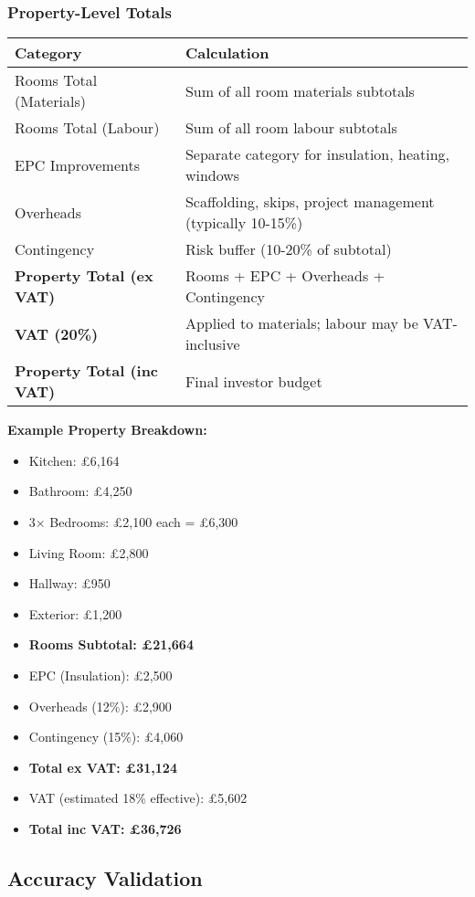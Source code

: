 \documentclass[11pt,a4paper]{article}
\begin{document}
\subsubsection{Property-Level Totals}

\begin{longtable}{@{}p{6cm}p{8cm}@{}}
\toprule
\textbf{Category} & \textbf{Calculation} \\
\midrule
Rooms Total (Materials) & Sum of all room materials subtotals \\
Rooms Total (Labour) & Sum of all room labour subtotals \\
EPC Improvements & Separate category for insulation, heating, windows \\
Overheads & Scaffolding, skips, project management (typically 10-15\%) \\
Contingency & Risk buffer (10-20\% of subtotal) \\
\addlinespace
\textbf{Property Total (ex VAT)} & Rooms + EPC + Overheads + Contingency \\
\textbf{VAT (20\%)} & Applied to materials; labour may be VAT-inclusive \\
\textbf{Property Total (inc VAT)} & Final investor budget \\
\bottomrule
\end{longtable}

\textbf{Example Property Breakdown:}
\begin{itemize}
  \item Kitchen: £6,164
  \item Bathroom: £4,250
  \item 3× Bedrooms: £2,100 each = £6,300
  \item Living Room: £2,800
  \item Hallway: £950
  \item Exterior: £1,200
  \item \textbf{Rooms Subtotal: £21,664}
  \item EPC (Insulation): £2,500
  \item Overheads (12\%): £2,900
  \item Contingency (15\%): £4,060
  \item \textbf{Total ex VAT: £31,124}
  \item VAT (estimated 18\% effective): £5,602
  \item \textbf{Total inc VAT: £36,726}
\end{itemize}

\subsection{Accuracy Validation}
\end{document}
